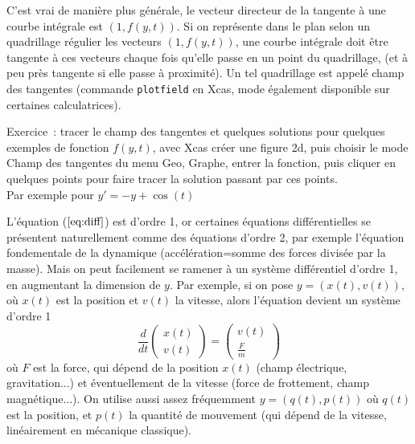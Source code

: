 \documentclass[a4paper,11pt]{book}
\begin{document}
\begin{giacjshere}
C'est vrai de mani\`ere plus g\'en\'erale, le vecteur directeur
de la tangente \`a une courbe int\'egrale est $(1,f(y,t))$. Si
on repr\'esente dans le plan selon un quadrillage r\'egulier
les vecteurs $(1,f(y,t))$, une courbe int\'egrale doit \^etre
tangente \`a ces vecteurs chaque fois qu'elle passe en un point
du quadrillage, (et \`a peu pr\`es tangente si elle passe \`a
proximit\'e). Un tel quadrillage est appel\'e champ des tangentes
(commande \verb|plotfield| en Xcas, mode \'egalement disponible
sur certaines calculatrices).

Exercice~: tracer le champ des tangentes et quelques solutions
pour quelques exemples de fonction $f(y,t)$, avec Xcas cr\'eer
une figure 2d, puis choisir le mode Champ des tangentes
du menu Geo, Graphe, entrer la fonction, puis cliquer en quelques
points pour faire tracer la solution passant par ces points.\\
Par exemple pour $y'=-y+\cos(t)$\\

L'\'equation (\(\ref{eq:diff}\)) est d'ordre 1, or certaines \'equations
diff\'erentielles se pr\'esentent naturellement comme des
\'equations d'ordre 2, par exemple l'\'equation fondementale
de la dynamique (acc\'el\'eration=somme des forces divis\'ee par
la masse). Mais on peut facilement se ramener \`a un
syst\`eme diff\'erentiel d'ordre
1, en augmentant la dimension de $y$. Par exemple, si
on pose $y=(x(t),v(t))$, o\`u $x(t)$ est la position
et $v(t)$ la vitesse, alors l'\'equation devient un syst\`eme d'ordre 1
$$ \frac{d}{dt} \left(\begin{array}{c} x(t) \\ v(t) \end{array}
\right) 
= \left(\begin{array}{c} v(t) \\ \frac{F}{m} \end{array} \right) $$
o\`u $F$ est la force, qui d\'epend de la position $x(t)$ 
(champ \'electrique, gravitation...) et
\'eventuellement de la vitesse (force de frottement, champ magn\'etique...).
On utilise aussi assez fr\'equemment $y=(q(t),p(t))$
o\`u $q(t)$ est la position, et $p(t)$ la quantit\'e de mouvement
(qui d\'epend de la vitesse, lin\'eairement en m\'ecanique classique).


\end{giacjshere}
\end{document}
